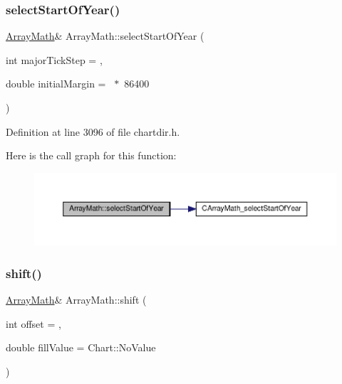 \subsubsection{\texorpdfstring{select\+Start\+Of\+Year()}{selectStartOfYear()}}
{\footnotesize\ttfamily \hyperlink{class_array_math}{Array\+Math}\& Array\+Math\+::select\+Start\+Of\+Year (\begin{DoxyParamCaption}\item[{int}]{major\+Tick\+Step = {},  }\item[{double}]{initial\+Margin = {~$\ast$~86400} }\end{DoxyParamCaption})\hspace{0.3cm}{\ttfamily [inline]}}



Definition at line 3096 of file chartdir.\+h.

Here is the call graph for this function\+:
\nopagebreak
\begin{figure}[H]
\begin{center}
\leavevmode
\includegraphics[width=350pt]{class_array_math_a49a76a80a68b10357db7f0189e3bfb2f_cgraph}
\end{center}
\end{figure}
\mbox{\label{class_array_math_a3448f6c81db45f84e63351a00f6d32b3}} 
\subsubsection{\texorpdfstring{shift()}{shift()}}
{\footnotesize\ttfamily \hyperlink{class_array_math}{Array\+Math}\& Array\+Math\+::shift (\begin{DoxyParamCaption}\item[{int}]{offset = {},  }\item[{double}]{fill\+Value = {\ttfamily Chart\+:\+:NoValue} }\end{DoxyParamCaption})\hspace{0.3cm}{\ttfamily [inline]}}



